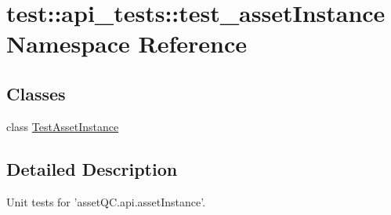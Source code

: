 \hypertarget{namespacetest_1_1api__tests_1_1test__assetInstance}{\section{test\-:\-:api\-\_\-tests\-:\-:test\-\_\-asset\-Instance \-Namespace \-Reference}
\label{df/d97/namespacetest_1_1api__tests_1_1test__assetInstance}
}
\subsection*{\-Classes}
\begin{DoxyCompactItemize}
\item 
class \hyperlink{classtest_1_1api__tests_1_1test__assetInstance_1_1TestAssetInstance}{\-Test\-Asset\-Instance}
\end{DoxyCompactItemize}


\subsection{\-Detailed \-Description}
\begin{DoxyVerb}
Unit tests for 'assetQC.api.assetInstance'.
\end{DoxyVerb}
 